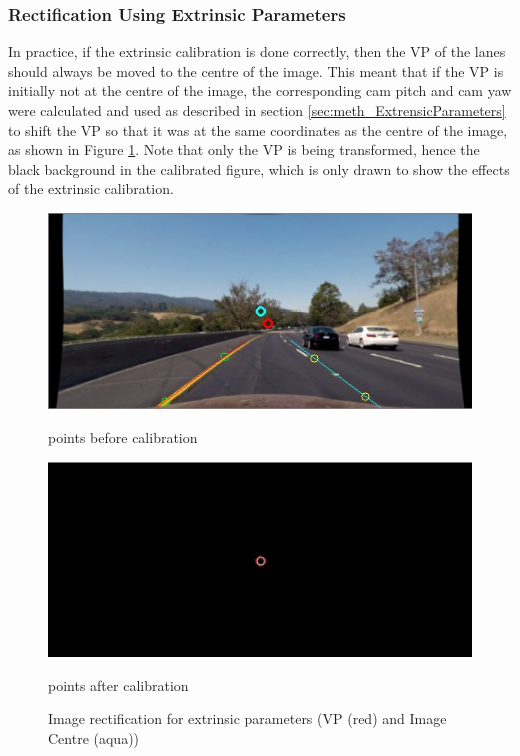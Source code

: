 \subsubsection{Rectification Using Extrinsic Parameters}

In practice, if the extrinsic calibration is done correctly, then the VP of the lanes should always be moved to the centre of the image. This meant that if the VP is initially not at the centre of the image, the corresponding cam pitch and cam yaw were calculated and used as described in section \ref{sec:meth_ExtrensicParameters} to shift the VP so that it was at the same coordinates as the centre of the image, as shown in Figure \ref{fig:extrParamCali}. Note that only the VP is being transformed, hence the black background in the calibrated figure, which is only drawn to show the effects of the extrinsic calibration. 

\begin{figure}[H]
    \centering
    \begin{minipage}[b]{0.49\linewidth}
    \includegraphics[width=\textwidth]{Figures/vp_initial.jpg}
    \caption*{points before calibration}
    \end{minipage}
    \begin{minipage}[b]{0.49\linewidth}
    \includegraphics[width=\textwidth]{Figures/vp_fixed.jpg}
    \caption*{points after calibration}
    \end{minipage}
    
    \caption{Image rectification for extrinsic parameters (VP (red) and Image Centre (aqua))}
    \label{fig:extrParamCali}
\end{figure}

